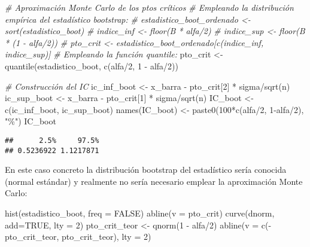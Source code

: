 \documentclass[
]{book}
\newenvironment{Shaded}{\begin{snugshade}}{\end{snugshade}}
\newcommand{\AttributeTok}[1]{\textcolor[rgb]{0.77,0.63,0.00}{#1}}
\newcommand{\CommentTok}[1]{\textcolor[rgb]{0.56,0.35,0.01}{\textit{#1}}}
\newcommand{\ConstantTok}[1]{\textcolor[rgb]{0.00,0.00,0.00}{#1}}
\newcommand{\DecValTok}[1]{\textcolor[rgb]{0.00,0.00,0.81}{#1}}
\newcommand{\FunctionTok}[1]{\textcolor[rgb]{0.00,0.00,0.00}{#1}}
\newcommand{\NormalTok}[1]{#1}
\newcommand{\OtherTok}[1]{\textcolor[rgb]{0.56,0.35,0.01}{#1}}
\newcommand{\SpecialCharTok}[1]{\textcolor[rgb]{0.00,0.00,0.00}{#1}}
\newcommand{\StringTok}[1]{\textcolor[rgb]{0.31,0.60,0.02}{#1}}
\theoremstyle{break}
\theoremstyle{definition}
\theoremstyle{definition}
\theoremstyle{definition}
\theoremstyle{definition}
\theoremstyle{remark}
\begin{document}
\begin{Shaded}
\begin{Highlighting}[]
\CommentTok{\# Aproximación Monte Carlo de los ptos críticos}
\CommentTok{\# Empleando la distribución empírica del estadístico bootstrap: }
    \CommentTok{\# estadistico\_boot\_ordenado \textless{}{-} sort(estadistico\_boot)}
    \CommentTok{\# indice\_inf \textless{}{-} floor(B * alfa/2)}
    \CommentTok{\# indice\_sup \textless{}{-} floor(B * (1 {-} alfa/2))}
    \CommentTok{\# pto\_crit \textless{}{-} estadistico\_boot\_ordenado[c(indice\_inf, indice\_sup)]}
\CommentTok{\# Empleando la función \textasciigrave{}quantile\textasciigrave{}:}
\NormalTok{pto\_crit }\OtherTok{\textless{}{-}} \FunctionTok{quantile}\NormalTok{(estadistico\_boot, }\FunctionTok{c}\NormalTok{(alfa}\SpecialCharTok{/}\DecValTok{2}\NormalTok{, }\DecValTok{1} \SpecialCharTok{{-}}\NormalTok{ alfa}\SpecialCharTok{/}\DecValTok{2}\NormalTok{))}

\CommentTok{\# Construcción del IC}
\NormalTok{ic\_inf\_boot }\OtherTok{\textless{}{-}}\NormalTok{ x\_barra }\SpecialCharTok{{-}}\NormalTok{ pto\_crit[}\DecValTok{2}\NormalTok{] }\SpecialCharTok{*}\NormalTok{ sigma}\SpecialCharTok{/}\FunctionTok{sqrt}\NormalTok{(n)}
\NormalTok{ic\_sup\_boot }\OtherTok{\textless{}{-}}\NormalTok{ x\_barra }\SpecialCharTok{{-}}\NormalTok{ pto\_crit[}\DecValTok{1}\NormalTok{] }\SpecialCharTok{*}\NormalTok{ sigma}\SpecialCharTok{/}\FunctionTok{sqrt}\NormalTok{(n)}
\NormalTok{IC\_boot }\OtherTok{\textless{}{-}} \FunctionTok{c}\NormalTok{(ic\_inf\_boot, ic\_sup\_boot)}
\FunctionTok{names}\NormalTok{(IC\_boot) }\OtherTok{\textless{}{-}} \FunctionTok{paste0}\NormalTok{(}\DecValTok{100}\SpecialCharTok{*}\FunctionTok{c}\NormalTok{(alfa}\SpecialCharTok{/}\DecValTok{2}\NormalTok{, }\DecValTok{1}\SpecialCharTok{{-}}\NormalTok{alfa}\SpecialCharTok{/}\DecValTok{2}\NormalTok{), }\StringTok{"\%"}\NormalTok{)}
\NormalTok{IC\_boot}
\end{Highlighting}
\end{Shaded}

\begin{verbatim}
##      2.5%     97.5% 
## 0.5236922 1.1217871
\end{verbatim}

En este caso concreto la distribución bootstrap del estadístico sería conocida (normal estándar) y realmente no sería necesario emplear la aproximación Monte Carlo:

\begin{Shaded}
\begin{Highlighting}[]
\FunctionTok{hist}\NormalTok{(estadistico\_boot, }\AttributeTok{freq =} \ConstantTok{FALSE}\NormalTok{)}
\FunctionTok{abline}\NormalTok{(}\AttributeTok{v =}\NormalTok{ pto\_crit)}
\FunctionTok{curve}\NormalTok{(dnorm, }\AttributeTok{add=}\ConstantTok{TRUE}\NormalTok{, }\AttributeTok{lty =} \DecValTok{2}\NormalTok{)}
\NormalTok{pto\_crit\_teor }\OtherTok{\textless{}{-}} \FunctionTok{qnorm}\NormalTok{(}\DecValTok{1} \SpecialCharTok{{-}}\NormalTok{ alfa}\SpecialCharTok{/}\DecValTok{2}\NormalTok{)}
\FunctionTok{abline}\NormalTok{(}\AttributeTok{v =} \FunctionTok{c}\NormalTok{(}\SpecialCharTok{{-}}\NormalTok{pto\_crit\_teor, pto\_crit\_teor), }\AttributeTok{lty =} \DecValTok{2}\NormalTok{)}
\end{Highlighting}
\end{Shaded}
\end{document}

